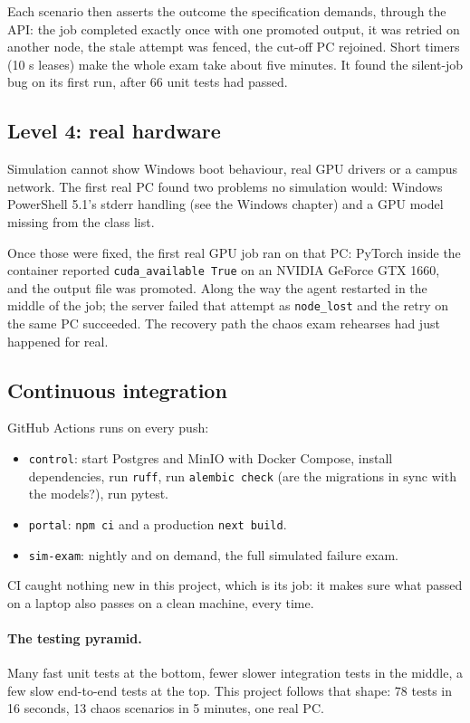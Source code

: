 Each scenario then asserts the outcome the specification demands, through the
API: the job completed exactly once with one promoted output, it was retried on
another node, the stale attempt was fenced, the cut-off PC rejoined. Short
timers (10 s leases) make the whole exam take about five minutes. It found the
silent-job bug on its first run, after 66 unit tests had passed.

\subsection{Level 4: real hardware}

Simulation cannot show Windows boot behaviour, real GPU drivers or a campus
network. The first real PC found two problems no simulation would: Windows
PowerShell 5.1's stderr handling (see the Windows chapter) and a GPU model missing
from the class list.

Once those were fixed, the first real GPU job ran on that PC: PyTorch inside the
container reported \texttt{cuda\_available True} on an NVIDIA GeForce GTX 1660,
and the output file was promoted. Along the way the agent restarted in the
middle of the job; the server failed that attempt as \texttt{node\_lost} and the
retry on the same PC succeeded. The recovery path the chaos exam rehearses had
just happened for real.

\subsection{Continuous integration}

GitHub Actions runs on every push:

\begin{itemize}
\item \texttt{control}: start Postgres and MinIO with Docker Compose, install
  dependencies, run \texttt{ruff}, run \texttt{alembic check} (are the
  migrations in sync with the models?), run pytest.
\item \texttt{portal}: \texttt{npm ci} and a production \texttt{next build}.
\item \texttt{sim-exam}: nightly and on demand, the full simulated failure exam.
\end{itemize}

CI caught nothing new in this project, which is its job: it makes sure what
passed on a laptop also passes on a clean machine, every time.

\paragraph{The testing pyramid.} Many fast unit tests at the bottom, fewer
slower integration tests in the middle, a few slow end-to-end tests at the top.
This project follows that shape: 78 tests in 16 seconds, 13 chaos scenarios in
5 minutes, one real PC.
